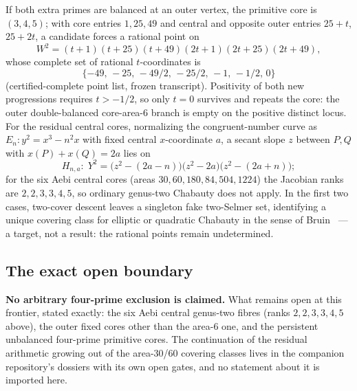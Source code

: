 \begin{proposition}\label{prop:outercore}
If both extra primes are balanced at an outer vertex, the primitive core is
$(3,4,5)$; with core entries $1,25,49$ and central and opposite outer
entries $25+t$, $25+2t$, a candidate forces a rational point on
\[
W^2=(t+1)(t+25)(t+49)(2t+1)(2t+25)(2t+49),
\]
whose complete set of rational $t$-coordinates is
\[
\{-49,\,-25,\,-49/2,\,-25/2,\,-1,\,-1/2,\,0\}
\]
(certified-complete point list, frozen transcript). Positivity of both new
progressions requires $t>-1/2$, so only $t=0$ survives and repeats the
core: the outer double-balanced core-area-6 branch is empty on the
positive distinct locus. For the residual central cores, normalizing the
congruent-number curve as $E_n\colon y^2=x^3-n^2x$ with fixed central
$x$-coordinate $a$, a secant slope $z$ between $P,Q$ with $x(P)+x(Q)=2a$
lies on
\[
H_{n,a}\colon\;Y^2=\bigl(z^2-(2a-n)\bigr)\bigl(z^2-2a\bigr)\bigl(z^2-(2a+n)\bigr);
\]
for the six Aebi central cores (areas $30,60,180,84,504,1224$) the Jacobian
ranks are $2,2,3,3,4,5$, so ordinary genus-two Chabauty does not apply. In
the first two cases, two-cover descent leaves a singleton fake two-Selmer
set, identifying a unique covering class for elliptic or quadratic
Chabauty in the sense of Bruin~\cite{BRU03} --- a target, not a result: the
rational points remain undetermined.
\end{proposition}

\subsection*{The exact open boundary}

\textbf{No arbitrary four-prime exclusion is claimed.} What remains open at this
frontier, stated exactly: the six Aebi central genus-two fibres (ranks
$2,2,3,3,4,5$ above), the outer fixed cores other than the area-6 one, and
the persistent unbalanced four-prime primitive cores. The continuation of
the residual arithmetic growing out of the area-30/60 covering classes
lives in the companion repository's
dossiers with its own open gates, and no statement about it is imported
here.
